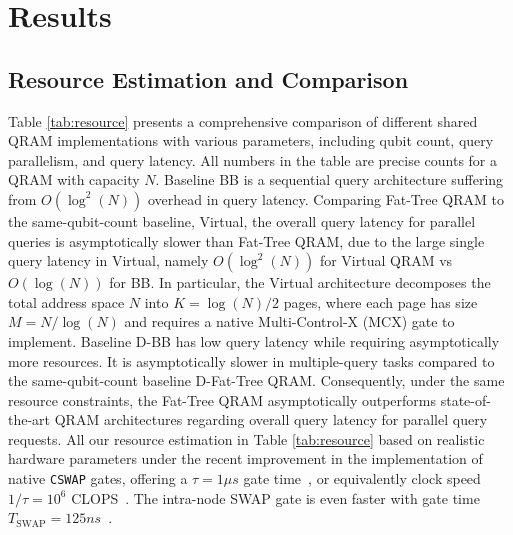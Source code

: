 \section{Results}
\label{sec:results}


\subsection{Resource Estimation and Comparison}
Table \ref{tab:resource} presents a comprehensive comparison of different shared QRAM implementations with various parameters, including qubit count, query parallelism, and query latency. All numbers in the table are precise counts for a QRAM with capacity $N$. Baseline BB is a sequential query architecture suffering from $O(\log^2(N))$ overhead in query latency.  Comparing Fat-Tree QRAM to the same-qubit-count baseline, Virtual, the overall query latency for parallel queries is asymptotically slower than Fat-Tree QRAM, due to the large single query latency in Virtual, namely $O(\log^2(N))$ for Virtual QRAM vs $O(\log(N))$ for BB. In particular, the Virtual architecture decomposes the total address space $N$ into $K= \log(N)/2$ pages, where each page has size $M= N/\log(N)$ and requires a native Multi-Control-X (MCX) gate to implement. Baseline D-BB has low query latency while requiring asymptotically more resources. It is asymptotically slower in multiple-query tasks compared to the same-qubit-count baseline D-Fat-Tree QRAM. Consequently, under the same resource constraints, the Fat-Tree QRAM asymptotically outperforms state-of-the-art QRAM architectures regarding overall query latency for parallel query requests. All our resource estimation in Table \ref{tab:resource} based on realistic hardware parameters under the recent improvement in the implementation of native \texttt{CSWAP} gates, offering a $\tau=1\mu s$ gate time~\cite{weiss2024quantum}, or equivalently clock speed $1/\tau= 10^6$ CLOPS~\cite{amico2023defining}. The intra-node SWAP gate is even faster with gate time $T_{\textrm{SWAP}}=125 ns$~\cite{liu2024quantum,weiss2024quantum}.

